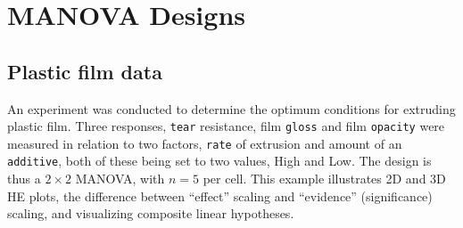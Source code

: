 \documentclass[11pt]{article}
\newcommand{\code}[1]{{\texttt{#1}}}
\begin{document}
\section{MANOVA Designs}

\subsection{Plastic film data}
An experiment was conducted to determine the optimum conditions for extruding plastic film. 
Three responses, \code{tear} resistance, film \code{gloss} and film \code{opacity}
were measured in relation to two factors, \code{rate} of extrusion and amount of an \code{additive},
both of these being set to two values, High and Low.
The design is thus a $2\times 2$ MANOVA, with $n=5$ per cell. 
This example illustrates 2D and 3D HE plots, the difference between 
``effect'' scaling and ``evidence'' (significance) scaling, and visualizing
composite linear hypotheses.
\end{document}
